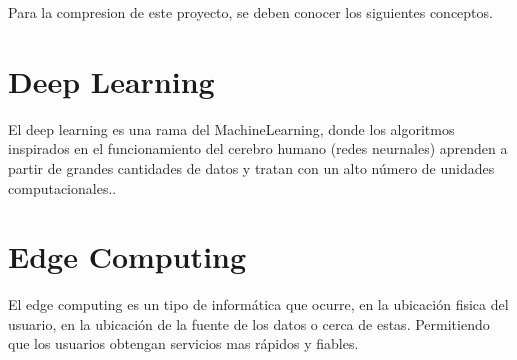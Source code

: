 
Para la compresion de este proyecto, se deben conocer los siguientes conceptos.

\section{Deep Learning} 

El deep learning \cite{deepLearning} es una rama del MachineLearning, donde los algoritmos inspirados en el funcionamiento del cerebro humano (redes neurnales) aprenden a partir de 
grandes cantidades de datos y tratan con un alto número de unidades computacionales..

\section{Edge Computing}

El edge computing \cite{edgeComputing} es un tipo de informática que ocurre, en la ubicación fisica del usuario, en la ubicación de la fuente de los datos o cerca de estas. Permitiendo 
que los usuarios obtengan servicios mas rápidos y fiables.